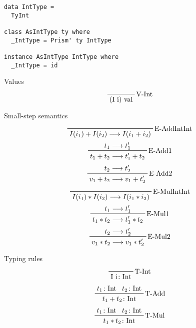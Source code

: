 \documentclass{beamer}
\begin{document}
\begin{frame}[fragile]
\begin{verbatim}
data IntType =
  TyInt

class AsIntType ty where
  _IntType = Prism' ty IntType

instance AsIntType IntType where
  _IntType = id
\end{verbatim}
\end{frame}

\begin{frame}[c]
  Values
  \begin{displaymath}  
    \prftree[r]{V-Int}
    {\text{(I i) val}}
  \end{displaymath} 
\end{frame}

\begin{frame}[c]
  Small-step semantics
  \begin{displaymath}  
    \prftree[r]{E-AddIntInt}
    {I (i_1) + I (i_2) \longrightarrow I (i_1 + i_2)}
  \end{displaymath}  
  \begin{displaymath}  
    \prftree[r]{E-Add1}
    {t_1 \longrightarrow t_1^{\prime}}
    {t_1 + t_2 \longrightarrow t_1^{\prime} + t_2}
  \end{displaymath}  
  \begin{displaymath}  
    \prftree[r]{E-Add2}
    {t_2 \longrightarrow t_2^{\prime}}
    {v_1 + t_2 \longrightarrow v_1 + t_2^{\prime}}
  \end{displaymath}  
  \begin{displaymath}  
    \prftree[r]{E-MulIntInt}
    {I (i_1) * I (i_2) \longrightarrow I (i_1 * i_2)}
  \end{displaymath}  
  \begin{displaymath}  
    \prftree[r]{E-Mul1}
    {t_1 \longrightarrow t_1^{\prime}}
    {t_1 * t_2 \longrightarrow t_1^{\prime} * t_2}
  \end{displaymath}  
  \begin{displaymath}  
    \prftree[r]{E-Mul2}
    {t_2 \longrightarrow t_2^{\prime}}
    {v_1 * t_2 \longrightarrow v_1 * t_2^{\prime}}
  \end{displaymath}  
\end{frame}

\begin{frame}
  Typing rules
  \begin{displaymath}  
    \prftree[r]{T-Int}
    {\text{I i} \colon \text{Int}}
  \end{displaymath}  
  \begin{displaymath}  
    \prftree[r]{T-Add}
    {t_1 \colon \text{Int}}
    {t_2 \colon \text{Int}}
    {t_1 + t_2 \colon \text{Int}}
  \end{displaymath}  
  \begin{displaymath}  
    \prftree[r]{T-Mul}
    {t_1 \colon \text{Int}}
    {t_2 \colon \text{Int}}
    {t_1 * t_2 \colon \text{Int}}
  \end{displaymath}  
\end{frame}
\end{document}
